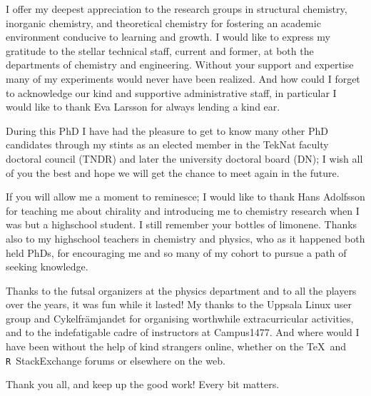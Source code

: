 \documentclass[draft,webedition,openright,titles,swedish,english]{LuaUUThesis}\usepackage[]{graphicx}\usepackage[]{xcolor}
\newcommand{\R}{\texttt{R}}
\begin{document}
I offer my deepest appreciation to the research groups in structural chemistry,
inorganic chemistry, and theoretical chemistry for fostering an academic environment
conducive to learning and growth.
I would like to express my gratitude to the stellar technical staff, current
and former, at both the departments of chemistry and engineering.
Without your support and expertise many of my experiments would
never have been realized.
And how could I forget to acknowledge our kind and supportive administrative staff,
in particular I would like to thank Eva Larsson for always lending a kind ear.

During this PhD I have had the pleasure to get to know many other PhD candidates
through my stints as an elected member in the TekNat faculty doctoral council (TNDR)
and later the university doctoral board (DN); I wish all of you the best and hope we will
get the chance to meet again in the future.

If you will allow me a moment to reminesce; I would like to thank
Hans Adolfsson  for teaching me about chirality
and introducing me to chemistry research when I was but a highschool student.
I still remember your bottles of limonene.
Thanks also to my highschool teachers in chemistry and physics,
who as it happened both held PhDs, for encouraging me and so many of my cohort
to pursue a path of seeking knowledge.


Thanks to the futsal organizers at the physics department and to all the players
over the years, it was fun while it lasted!
My thanks to the Uppsala Linux user group and Cykelfrämjandet for organising
worthwhile extracurricular activities, and to the indefatigable cadre of
instructors at Campus1477.
And where would I have been without the help of kind strangers online, whether
on the \TeX\ and \R\ StackExchange forums or elsewhere on the web.

Thank you all, and keep up the good work! Every bit matters.


\egroup


\printbibliography[%
   title=References,%
   heading=bibintoc%
]


\cleardoublepage
\begingroup
   \let\cleardoublepage\relax

   \setcounter{lofdepth}{1}
   \renewcommand{\listfigurename}{List of figures}
   \addcontentsline{toc}{chapter}{\listfigurename}
   \listoffigures
\end{document}
